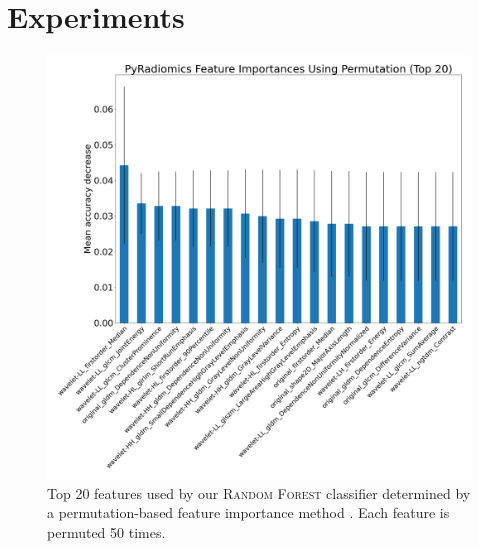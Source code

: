 \section{Experiments}
\label{sec:experiments}

\begin{figure}[t]
    \centering
    \includegraphics[width=1\linewidth]{figures/random_forest_permutation_based_feature_importance.png}
    \caption{Top 20 features used by our \textsc{Random Forest} classifier determined by a permutation-based feature importance method \citep{breiman2001random}. Each feature is permuted 50 times.}
    \label{fig:random_forest}
\end{figure}

